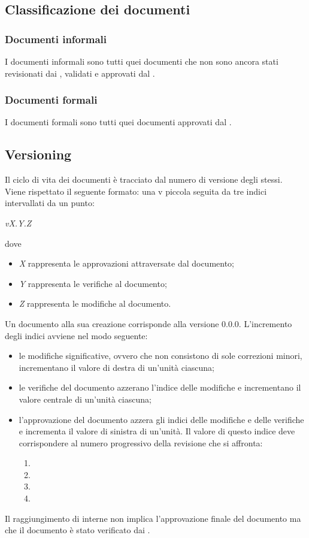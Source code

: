\subsection{Classificazione dei documenti}
\subsubsection{Documenti informali}
I documenti informali sono tutti quei documenti che non sono ancora stati revisionati dai \Verificatori{}, validati e approvati dal \Responsabile{}.

\subsubsection{Documenti formali}
I documenti formali sono tutti quei documenti approvati dal \Responsabile{}.

\subsection{Versioning}
Il ciclo di vita dei documenti è tracciato dal numero di versione degli stessi.\\
Viene rispettato il seguente formato: una v piccola seguita da tre indici intervallati da un punto:
\begin{center}
	\textit{vX.Y.Z}
\end{center}
dove
\begin{itemize}
	\item \textit{X} rappresenta le approvazioni attraversate dal documento;
	\item \textit{Y} rappresenta le verifiche al documento;
	\item \textit{Z} rappresenta le modifiche al documento.
\end{itemize}
Un documento alla sua creazione corrisponde alla versione 0.0.0. L’incremento degli indici avviene nel modo seguente:
\begin{itemize}
	\item le modifiche significative, ovvero che non consistono di sole correzioni minori, incrementano il valore di destra di un'unità ciascuna;
	\item le verifiche del documento azzerano l'indice delle modifiche e incrementano il valore centrale di un'unità ciascuna;
	\item l'approvazione del documento azzera gli indici delle modifiche e delle verifiche e incrementa il valore di sinistra di un'unità. Il valore di questo indice deve corrispondere al numero progressivo della revisione che si affronta:
	\begin{enumerate}
		\item \RR
		\item \RP
		\item \RQ
		\item \RA
	\end{enumerate} 
\end{itemize}
Il raggiungimento di  interne non implica l'approvazione finale del documento ma che il documento è stato verificato dai \Verificatori{}.

